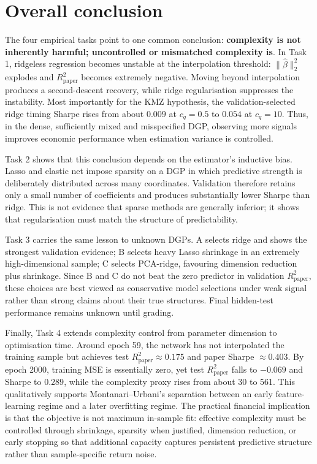 \documentclass[11pt,a4paper]{article}
\newcommand{\Rpaper}{R^2_{\mathrm{paper}}}
\begin{document}
\section{Overall conclusion}
The four empirical tasks point to one common conclusion: \textbf{complexity is not inherently harmful; uncontrolled or mismatched complexity is}. In Task 1, ridgeless regression becomes unstable at the interpolation threshold: $\|\hat\beta\|_2^2$ explodes and $\Rpaper$ becomes extremely negative. Moving beyond interpolation produces a second-descent recovery, while ridge regularisation suppresses the instability. Most importantly for the KMZ hypothesis, the validation-selected ridge timing Sharpe rises from about $0.009$ at $c_q=0.5$ to $0.054$ at $c_q=10$. Thus, in the dense, sufficiently mixed and misspecified DGP, observing more signals improves economic performance when estimation variance is controlled.

Task 2 shows that this conclusion depends on the estimator's inductive bias. Lasso and elastic net impose sparsity on a DGP in which predictive strength is deliberately distributed across many coordinates. Validation therefore retains only a small number of coefficients and produces substantially lower Sharpe than ridge. This is not evidence that sparse methods are generally inferior; it shows that regularisation must match the structure of predictability.

Task 3 carries the same lesson to unknown DGPs. A selects ridge and shows the strongest validation evidence; B selects heavy Lasso shrinkage in an extremely high-dimensional sample; C selects PCA-ridge, favouring dimension reduction plus shrinkage. Since B and C do not beat the zero predictor in validation $\Rpaper$, these choices are best viewed as conservative model selections under weak signal rather than strong claims about their true structures. Final hidden-test performance remains unknown until grading.

Finally, Task 4 extends complexity control from parameter dimension to optimisation time. Around epoch 59, the network has not interpolated the training sample but achieves test $\Rpaper\approx0.175$ and paper Sharpe $\approx0.403$. By epoch 2000, training MSE is essentially zero, yet test $\Rpaper$ falls to $-0.069$ and Sharpe to $0.289$, while the complexity proxy rises from about 30 to 561. This qualitatively supports Montanari--Urbani's separation between an early feature-learning regime and a later overfitting regime. The practical financial implication is that the objective is not maximum in-sample fit: effective complexity must be controlled through shrinkage, sparsity when justified, dimension reduction, or early stopping so that additional capacity captures persistent predictive structure rather than sample-specific return noise.
\end{document}

